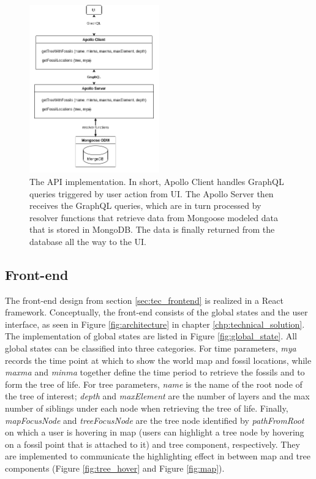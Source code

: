\documentclass[11pt, a4paper,oneside,chapterprefix=false]{scrbook}
\begin{document}
\begin{figure}[h]
	\centering
	\includegraphics[width=0.5\textwidth]{figures/implementation/api}
	\caption{The API implementation. In short, Apollo Client handles GraphQL queries triggered by user action from UI. The Apollo Server then receives the GraphQL queries, which are in turn processed by resolver functions that retrieve data from Mongoose modeled data that is stored in MongoDB. The data is finally returned from the database all the way to the UI. }
	\label{fig:api}
\end{figure}

\subsection{Front-end} \label{subsec: implementation_frontend}
The front-end design from section \ref{sec:tec_frontend} is realized in a React framework. Conceptually, the front-end consists of the global states and the user interface, as seen in Figure \ref{fig:architecture} in chapter \ref{chp:technical_solution}. The implementation of global states are listed in Figure \ref{fig:global_state}. All global states can be classified into three categories. For time parameters, \emph{mya} records the time point at which to show the world map and fossil locations, while \emph{maxma} and \emph{minma} together define the time period to retrieve the fossils and to form the tree of life. For tree parameters, \emph{name} is the name of the root node of the tree of interest; \emph{depth} and \emph{maxElement} are the number of layers and the max number of siblings under each node when retrieving the tree of life. Finally, \emph{mapFocusNode} and \emph{treeFocusNode} are the tree node identified by \emph{pathFromRoot} on which a user is hovering in map (users can highlight a tree node by hovering on a fossil point that is attached to it) and tree component, respectively. They are implemented to communicate the highlighting effect in between map and tree components (Figure \ref{fig:tree_hover} and Figure \ref{fig:map}). \\
\end{document}
